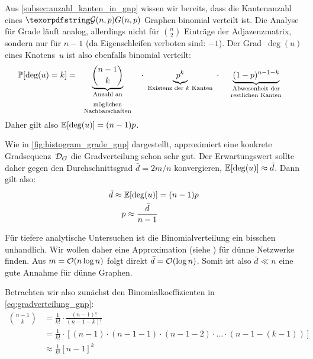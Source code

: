 Aus \cref{subsec:anzahl_kanten_in_gnp} wissen wir bereits, dass die Kantenanzahl eines $\Gnp$ Graphen binomial verteilt ist.
Die Analyse für Grade läuft analog, allerdings nicht für $\binom n 2$ Einträge der Adjazenzmatrix, sondern nur für $n-1$ (da Eigenschleifen verboten sind: $-1$).
Der Grad~$\deg(u)$ eines Knotens~$u$ ist also ebenfalls binomial verteilt:
\begin{align}
    \prob{\deg(u) = k} =
    \underbrace{\binom{n-1}{k}}_\text{\begin{minipage}{9em}\centering Anzahl an möglichen\\[-0.5em] Nachbarschaften\end{minipage}}
    \ \cdot \
    \underbrace{p^k}_\text{Existenz der $k$ Kanten}
    \ \cdot \
    \underbrace{(1-p)^{n-1-k}}_\text{\begin{minipage}{10em}\centering Abwesenheit der \\[-0.5em] restlichen Kanten\end{minipage}}
    \label{eq:gradverteilung_gnp}
\end{align}
Daher gilt also $\mathbb{E}\!\left[\deg(u)\right] = (n-1)p$.

Wie in \cref{fig:histogram_grade_gnp} dargestellt, approximiert eine konkrete Gradsequenz~$\mathcal{D}_G$ die Gradverteilung schon sehr gut.
Der Erwartungswert sollte daher gegen den Durchschnittsgrad $\bar d = 2m / n$ konvergieren, \dh $\mathbb{E}\!\left[\deg(u)\right] \approx \bar d$.
Dann gilt also:
\begin{align}
    \bar d \approx \mathbb{E}\!\left[\deg(u)\right] & = (n-1)p \\
    p \approx \frac{\bar d}{n-1} \label{eq:gnp_p_von_avg_deg}
\end{align}

Für tiefere analytische Untersuchen ist die Binomialverteilung ein bisschen unhandlich.
Wir wollen daher eine Approximation (siehe \cite{barabasi2014network}) für dünne Netzwerke finden.
Aus $m = \mathcal{O}\!\left(n \log n\right)$ folgt direkt $\bar d = \mathcal{O}\!\left(\log n\right)$.
Somit ist also $\bar d \ll n$ eine gute Annahme für dünne Graphen.

\medskip

Betrachten wir also zunächst den Binomialkoeffizienten in \cref{eq:gradverteilung_gnp}:
\begin{align}
    \binom{n-1}{k}
     & = \frac{1}{k!} \cdot \frac{(n-1)!}{(n-1-k)!}                                                              \\
     & = \frac{1}{k!} \cdot \left[ (n-1) \cdot (n-1-1) \cdot (n-1-2) \cdot \ldots \cdot (n-1-(k - 1))    \right] \\
     & \approx \frac{1}{k!} \left[ n- 1 \right]^k
\end{align}

